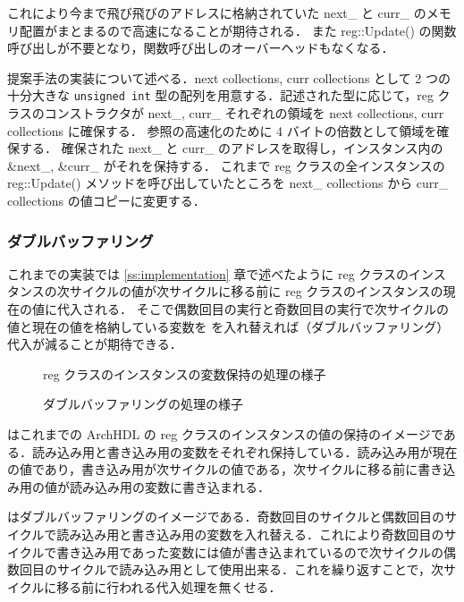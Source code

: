 これにより今まで飛び飛びのアドレスに格納されていた next\_ と curr\_ のメモリ配置がまとまるので高速になることが期待される．
また reg::Update() の関数呼び出しが不要となり，関数呼び出しのオーバーヘッドもなくなる．

提案手法の実装について述べる．next collections, curr collections として 2 つの十分大きな \verb/unsigned int/ 型の配列を用意する．記述された型に応じて，reg クラスのコンストラクタが next\_, curr\_ それぞれの領域を next collections, curr collections に確保する．
参照の高速化のために 4 バイトの倍数として領域を確保する．
確保された next\_ と curr\_ のアドレスを取得し，インスタンス内の \&next\_, \&curr\_ がそれを保持する．
これまで reg クラスの全インスタンスの reg::Update() メソッドを呼び出していたところを next\_ collections から curr\_ collections の値コピーに変更する．


\subsubsection{ダブルバッファリング}

これまでの実装では \ref{ss:implementation} 章で述べたように reg
クラスのインスタンスの次サイクルの値が次サイクルに移る前に reg
クラスのインスタンスの現在の値に代入される．
そこで偶数回目の実行と奇数回目の実行で次サイクルの値と現在の値を格納している変数を
を入れ替えれば（ダブルバッファリング）代入が減ることが期待できる．

\begin{figure}[t]
 \begin{center}
  
 \end{center}
 \caption{reg クラスのインスタンスの変数保持の処理の様子}
 \label{fig:reg_curr_next}
\end{figure}

\begin{figure}[t]
 \begin{center}
  
 \end{center}
 \caption{ダブルバッファリングの処理の様子}
 \label{fig:double_buffer}
\end{figure}

 はこれまでの ArchHDL の reg
クラスのインスタンスの値の保持のイメージである．読み込み用と書き込み用の変数をそれぞれ保持している．読み込み用が現在の値であり，書き込み用が次サイクルの値である，次サイクルに移る前に書き込み用の値が読み込み用の変数に書き込まれる．

はダブルバッファリングのイメージである．奇数回目のサイクルと偶数回目のサイクルで読み込み用と書き込み用の変数を入れ替える．これにより奇数回目のサイクルで書き込み用であった変数には値が書き込まれているので次サイクルの偶数回目のサイクルで読み込み用として使用出来る．これを繰り返すことで，次サイクルに移る前に行われる代入処理を無くせる．


